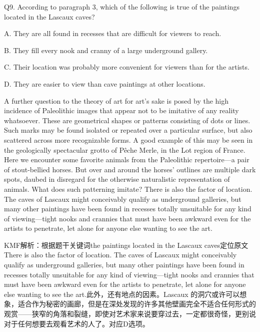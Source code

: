 \begin{blk}
    \begin{qst}
        Q9.
        According to paragraph 3, which of the following is true of the paintings located in the Lascaux caves?
    \end{qst}

    \begin{chc}
        A.
        They are all found in recesses that are difficult for viewers to reach.

        B.
        They fill every nook and cranny of a large underground gallery.

        C.
        Their location was probably more convenient for viewers than for the artists.

        D.
        They are easier to view than cave paintings at other locations.
    \end{chc}

    \begin{psgq}
        A further question to the theory of art for art’s sake is posed by the high incidence of Paleolithic images that appear not to be imitative of any reality whatsoever. These are geometrical shapes or patterns consisting of dots or lines. Such marks may be found isolated or repeated over a particular surface, but also scattered across more recognizable forms. A good example of this may be seen in the geologically spectacular grotto of Pêche Merle, in the Lot region of France. Here we encounter some favorite animals from the Paleolithic repertoire—a pair of stout-bellied horses. But over and around the horses’ outlines are multiple dark spots, daubed in disregard for the otherwise naturalistic representation of animals. What does such patterning imitate? There is also the factor of location. The caves of Lascaux might conceivably qualify as underground galleries, but many other paintings have been found in recesses totally unsuitable for any kind of viewing—tight nooks and crannies that must have been awkward even for the artists to penetrate, let alone for anyone else wanting to see the art.
    \end{psgq}

    \begin{nlz}
        KMF解析：根据题干关键词the paintings located in the Lascaux caves定位原文There is also the factor of location. The caves of Lascaux might conceivably qualify as underground galleries, but many other paintings have been found in recesses totally unsuitable for any kind of viewing—tight nooks and crannies that must have been awkward even for the artists to penetrate, let alone for anyone else wanting to see the art.此外，还有地点的因素。Lascaux 的洞穴或许可以想象，适合作为秘密的画廊，但是在深处发现的许多其他壁画完全不适合任何形式的观赏——狭窄的角落和裂缝，即使对艺术家来说要穿过去，一定都很奇怪，更别说对于任何想要去观看艺术的人了。对应D选项。
    \end{nlz}
\end{blk}

